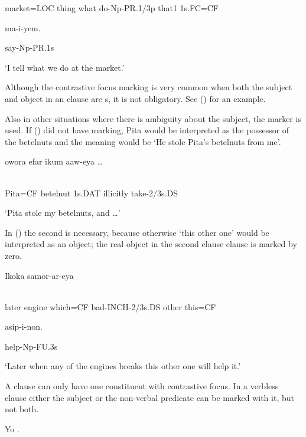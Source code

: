 market=LOC  thing  what  do-Np-PR.1/3p  that1  1s.FC=CF

ma-i-yem.

say-Np-PR.1s

`I tell what we do at the market.' 

Although the contrastive focus marking is very common when both the subject and object in an  clause are s, it is not obligatory. See () for an example. 

Also in other situations where there is ambiguity about the subject, the  marker is used. If () did not have  marking, Pita would be interpreted as the possessor of the betelnuts and the meaning would be `He stole Pita's betelnuts from me'.

\ea%
\label{ex:x1705}
\gll {}  owora  efar  ikum  aaw-eya  {\dots} \\
      \\
\glt
\z

Pita=CF  betelnut  1s.DAT  illicitly  take-2/3s.DS

`Pita stole my betelnuts, and {\dots}'

In () the second  is necessary, because otherwise `this other one' would be interpreted as an object; the real object in the second clause clause is marked by zero.

\ea%
\label{ex:x1706}
\gll Ikoka    samor-ar-eya   \\
      \\
\glt
\z

later  engine  which=CF  bad-INCH-2/3s.DS  other  this=CF

asip-i-non.

help-Np-FU.3s

`Later when any of the engines breaks this other one will help it.'

A clause can only have one constituent with contrastive focus. In a verbless clause  either the subject or the non-verbal predicate can be marked with it, but not both.

\ea%
\label{ex:x1707}
\gll Yo  . \\
      \\
\glt
\z

